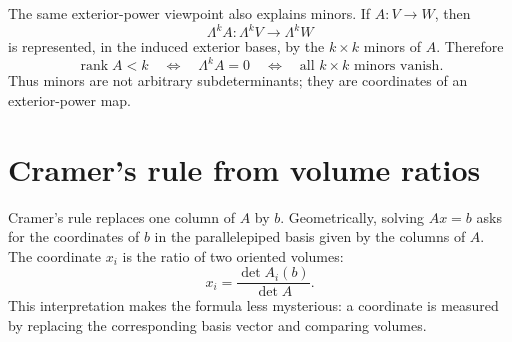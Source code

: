 The same exterior-power viewpoint also explains minors.  If \(A:V\to W\), then
\[
  \Lambda^kA:\Lambda^kV\to\Lambda^kW
\]
is represented, in the induced exterior bases, by the \(k\times k\) minors of \(A\).  Therefore
\[
  \operatorname{rank}A<k
  \quad\Longleftrightarrow\quad
  \Lambda^kA=0
  \quad\Longleftrightarrow\quad
  \text{all }k\times k\text{ minors vanish}.
\]
Thus minors are not arbitrary subdeterminants; they are coordinates of an exterior-power map.

\section{Cramer's rule from volume ratios}

Cramer's rule replaces one column of \(A\) by \(b\).  Geometrically, solving \(Ax=b\) asks for the coordinates of \(b\) in the parallelepiped basis given by the columns of \(A\).  The coordinate \(x_i\) is the ratio of two oriented volumes:
\[
  x_i=\frac{\det A_i(b)}{\det A}.
\]
This interpretation makes the formula less mysterious: a coordinate is measured by replacing the corresponding basis vector and comparing volumes.
